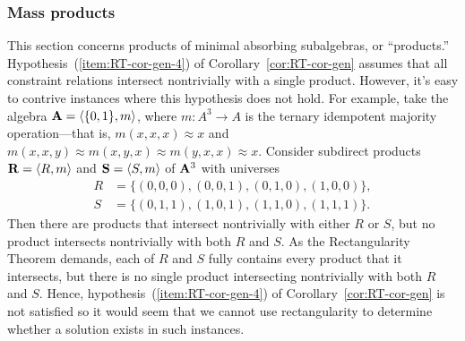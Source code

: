 \subsubsection{Mass products}
\label{sec:mass-products}
This section concerns products of minimal absorbing subalgebras, or
``\mas products.'' Hypothesis~(\ref{item:RT-cor-gen-4}) of
Corollary~\ref{cor:RT-cor-gen} assumes that all constraint relations intersect
nontrivially with a single \mas product.
However, it's easy to contrive instances where this hypothesis does not hold.
For example, take the algebra $\mathbf{A} = \langle\{0,1\}, m\rangle$,
where $m \colon A^3 \to A$ is the ternary idempotent majority operation---that is,
$m(x,x,x)\approx x$ and $m(x,x,y)\approx m(x,y,x)\approx m(y,x,x) \approx x$.
Consider subdirect products $\mathbf{R} = \langle R, m\rangle$ and $\mathbf{S}=\langle S, m\rangle$ of
$\mathbf{A}^3$ with universes
  \begin{align*}
  R &= \{(0,0,0), (0,0,1), (0,1,0), (1,0,0)\},\\
  S &= \{(0,1,1), (1,0,1), (1,1,0), (1,1,1)\}.
  \end{align*}
  Then there are \mas products that intersect nontrivially with either $R$ or $S$, 
  but no \mas product intersects nontrivially with both $R$ and $S$. 
  As the Rectangularity Theorem demands,
  each of $R$ and $S$ fully contains every \mas product that it intersects, but there is no
  single \mas product intersecting nontrivially with both $R$ and $S$. Hence,
  hypothesis~(\ref{item:RT-cor-gen-4}) of Corollary~\ref{cor:RT-cor-gen} is not
  satisfied so it would seem that we cannot use rectangularity 
  to determine whether a solution exists in such instances.
  
